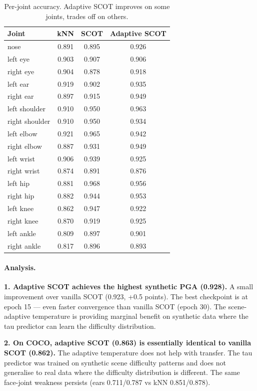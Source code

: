 \begin{table}[H]
\centering
\footnotesize
\begin{tabular}{lccc}
\toprule
Joint & kNN & SCOT & Adaptive SCOT \\
\midrule
nose & 0.891 & 0.895 & 0.926 \\
left eye & 0.903 & 0.907 & 0.906 \\
right eye & 0.904 & 0.878 & 0.918 \\
left ear & 0.919 & 0.902 & 0.935 \\
right ear & 0.897 & 0.915 & 0.949 \\
left shoulder & 0.910 & 0.950 & 0.963 \\
right shoulder & 0.910 & 0.950 & 0.934 \\
left elbow & 0.921 & 0.965 & 0.942 \\
right elbow & 0.887 & 0.931 & 0.949 \\
left wrist & 0.906 & 0.939 & 0.925 \\
right wrist & 0.874 & 0.891 & 0.876 \\
left hip & 0.881 & 0.968 & 0.956 \\
right hip & 0.882 & 0.944 & 0.953 \\
left knee & 0.862 & 0.947 & 0.922 \\
right knee & 0.870 & 0.919 & 0.925 \\
left ankle & 0.809 & 0.897 & 0.901 \\
right ankle & 0.817 & 0.896 & 0.893 \\
\bottomrule
\end{tabular}
\caption{Per-joint accuracy. Adaptive SCOT improves on some joints, trades off on others.}
\end{table}


\paragraph{Analysis.}

\textbf{1. Adaptive SCOT achieves the highest synthetic PGA (0.928).} A small improvement over vanilla SCOT (0.923, +0.5 points). The best checkpoint is at epoch 15 --- even faster convergence than vanilla SCOT (epoch 30). The scene-adaptive temperature is providing marginal benefit on synthetic data where the tau predictor can learn the difficulty distribution.

\textbf{2. On COCO, adaptive SCOT (0.863) is essentially identical to vanilla SCOT (0.862).} The adaptive temperature does not help with transfer. The tau predictor was trained on synthetic scene difficulty patterns and does not generalise to real data where the difficulty distribution is different. The same face-joint weakness persists (ears 0.711/0.787 vs kNN 0.851/0.878).

